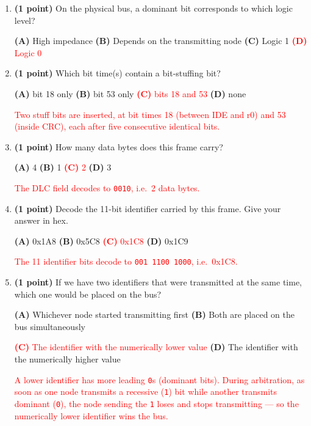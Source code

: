 \documentclass[10pt]{article}
\newcommand{\sol}[1]{\textcolor{red}{#1}}
\begin{document}
\begin{enumerate}[label=\textbf{\arabic*.}, leftmargin=*, itemsep=8pt]
\begin{enumerate}[label=(\alph*), leftmargin=*, itemsep=6pt]
\item \textbf{(1 point)} On the physical bus, a dominant bit corresponds to which logic level?

\centerline{\textbf{(A)} High impedance \qquad \textbf{(B)} Depends on the transmitting node \qquad \textbf{(C)} Logic 1 \qquad \sol{\textbf{(D)} Logic 0}}

\item \textbf{(1 point)} Which bit time(s) contain a bit-stuffing bit?

\centerline{\textbf{(A)} bit 18 only \qquad \textbf{(B)} bit 53 only \qquad \sol{\textbf{(C)} bits 18 and 53} \qquad \textbf{(D)} none}
\sol{Two stuff bits are inserted, at bit times 18 (between IDE and r0) and 53 (inside CRC), each after five consecutive identical bits.}

\item \textbf{(1 point)} How many data bytes does this frame carry?

\centerline{\textbf{(A)} 4 \qquad \textbf{(B)} 1 \qquad \sol{\textbf{(C)} 2} \qquad \textbf{(D)} 3}
\sol{The DLC field decodes to \texttt{0010}, i.e.\ 2 data bytes.}

\item \textbf{(1 point)} Decode the 11-bit identifier carried by this frame. Give your answer in hex.

\centerline{\textbf{(A)} 0x1A8 \qquad \textbf{(B)} 0x5C8 \qquad \sol{\textbf{(C)} 0x1C8} \qquad \textbf{(D)} 0x1C9}
\sol{The 11 identifier bits decode to \texttt{001 1100 1000}, i.e.\ 0x1C8.}

\item \textbf{(1 point)} If we have two identifiers that were transmitted at the same time, which one would be placed on the bus?

\centerline{\textbf{(A)} Whichever node started transmitting first \qquad \textbf{(B)} Both are placed on the bus simultaneously}
\centerline{\sol{\textbf{(C)} The identifier with the numerically lower value} \qquad \textbf{(D)} The identifier with the numerically higher value}
\sol{A lower identifier has more leading \texttt{0}s (dominant bits). During arbitration, as soon as one node transmits a recessive (\texttt{1}) bit while another transmits dominant (\texttt{0}), the node sending the \texttt{1} loses and stops transmitting --- so the numerically lower identifier wins the bus.}
\end{enumerate}

\end{enumerate}
\end{document}
